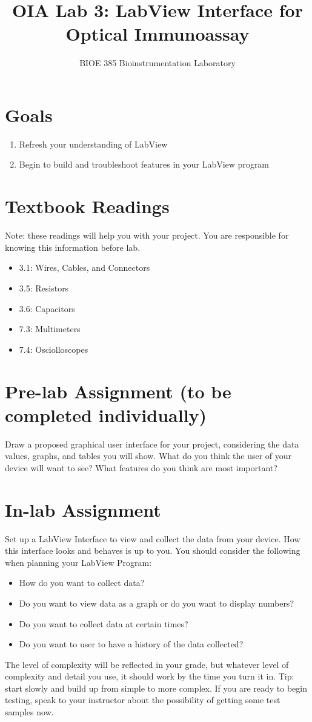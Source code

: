 \documentclass{article}
\title{OIA Lab 3: LabView Interface for Optical Immunoassay}
\author{BIOE 385 Bioinstrumentation Laboratory}
\date{}
\begin{document}
\large
\maketitle

\section*{Goals}
\begin{enumerate}
	\item Refresh your understanding of LabView
	\item Begin to build and troubleshoot features in your LabView program
\end{enumerate}

\section*{Textbook Readings}
Note: these readings will help you with your project.  You are responsible for knowing this information before lab.
\begin{itemize}
	\item 3.1: Wires, Cables, and Connectors
	\item 3.5: Resistors
	\item 3.6: Capacitors
	\item 7.3: Multimeters
	\item 7.4: Osciolloscopes
\end{itemize}

\section*{Pre-lab Assignment (to be completed individually)}
Draw a proposed graphical user interface for your project, considering the data values, graphs, and tables you will show. What do you think the user of your device will want to see? What features do you think are most important?

\section*{In-lab Assignment}
Set up a LabView Interface to view and collect the data from your device. How this interface looks and behaves is up to you. You should consider the following when planning your LabView Program:
	\begin{itemize}
		\item How do you want to collect data?
		\item Do you want to view data as a graph or do you want to display numbers?
		\item Do you want to collect data at certain times?
		\item Do you want to user to have a history of the data collected?
	\end{itemize}

The level of complexity will be reflected in your grade, but whatever level of complexity and detail you use, it should work by the time you turn it in. Tip: start slowly and build up from simple to more complex. If you are ready to begin testing, speak to your instructor about the possibility of getting some test samples now.
\end{document}
